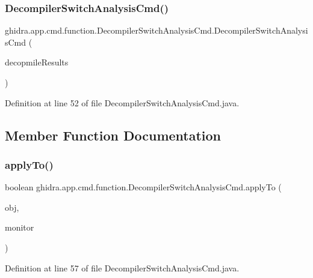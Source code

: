 \subsubsection{\texorpdfstring{DecompilerSwitchAnalysisCmd()}{DecompilerSwitchAnalysisCmd()}}
{\footnotesize\ttfamily ghidra.\+app.\+cmd.\+function.\+Decompiler\+Switch\+Analysis\+Cmd.\+Decompiler\+Switch\+Analysis\+Cmd (\begin{DoxyParamCaption}\item[{\mbox{\hyperlink{classghidra_1_1app_1_1decompiler_1_1_decompile_results}{Decompile\+Results}}}]{decopmile\+Results }\end{DoxyParamCaption})\hspace{0.3cm}{\ttfamily [inline]}}



Definition at line 52 of file Decompiler\+Switch\+Analysis\+Cmd.\+java.



\subsection{Member Function Documentation}
\mbox{\label{classghidra_1_1app_1_1cmd_1_1function_1_1_decompiler_switch_analysis_cmd_aa1850c989d5d7025bfa8e3eaeaeac440}} 
\subsubsection{\texorpdfstring{applyTo()}{applyTo()}}
{\footnotesize\ttfamily boolean ghidra.\+app.\+cmd.\+function.\+Decompiler\+Switch\+Analysis\+Cmd.\+apply\+To (\begin{DoxyParamCaption}\item[{Domain\+Object}]{obj,  }\item[{Task\+Monitor}]{monitor }\end{DoxyParamCaption})\hspace{0.3cm}{\ttfamily [inline]}}



Definition at line 57 of file Decompiler\+Switch\+Analysis\+Cmd.\+java.

\mbox{\label{classghidra_1_1app_1_1cmd_1_1function_1_1_decompiler_switch_analysis_cmd_aa0ca0c7c8f64f75c895be701209fc1fd}} 
